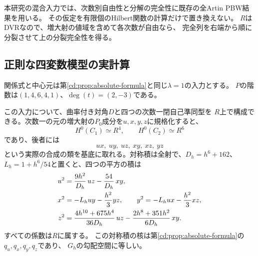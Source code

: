 本研究の混合入力では、次数別自由性と分解の完全性に既存の全Artin PBW結果を用いる。
その仮定を有限個のHilbert関数の計算だけで置き換えない。
$R$はDVRなので、増大射の値域を含めて各次数が自由なら、
完全列を右端から順に分裂させて上の分裂完全性を得る。

\subsection{正則な四変数模型の実計算}
関係式と中心元は第\ref{cd:prop:absolute-formula}と同じ$\lambda=1$の入力とする。
$P$の階数は$(1,4,6,4,1)$、$\deg(t)=(2,-3)$である。
\begin{theorem}[局所正則な低次数積]\label{rd:thm:local-product}
この入力について、曲率付き対角$D$と四つの次数一閉自己準同型を
$R$上で構成できる。次数一の元の増大射の$P_0$成分を$u,x,y,z$に規格化すると、
\[
 H^0(C_1)\simeq R^4,\qquad H^0(C_2)\simeq R^6
\]
であり、後者には
\[
 ux,\ uy,\ uz,\ xy,\ xz,\ yz
 \tag{RD2}\label{rd:eq:class-basis}
\]
という実際の合成の類を基底に取れる。対称積は全射で、$D_h=h^6+162$、
$L_h=1+h^6/54$と置くと、四つの平方の積は
\begin{align}
 u^2&=\frac{9h^2}{D_h}\,uz-\frac{54}{D_h}\,xy,\notag\\
 x^2&=-L_huy-\frac{h^2}{3}yz,\qquad
 y^2=-L_hux-\frac{h^2}{3}xz,\label{rd:eq:product}\\
 z^2&=\frac{4h^{10}+675h^4}{36D_h}\,uz
       -\frac{2h^8+351h^2}{6D_h}\,xy.\notag
\end{align}
すべての係数は$R$に属する。
この対称積の核は第\ref{cd:prop:absolute-formula}の$q_u,q_x,q_y,q_z$であり、
$G_h$の勾配空間に等しい。
\end{theorem}
